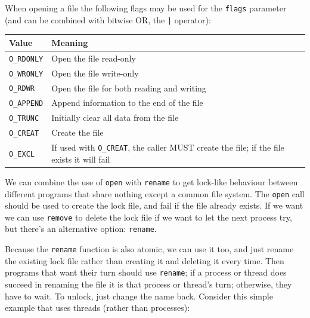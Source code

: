 When opening a file the following flags may be used for the \texttt{flags} parameter (and can be combined with bitwise OR, the \texttt{|} operator):

\begin{tabular}{l|l}
	\textbf{Value}     & \textbf{Meaning}                                                                                 \\ \hline
	\texttt{O\_RDONLY} & Open the file read-only                                                                          \\ \hline
	\texttt{O\_WRONLY} & Open the file write-only                                                                         \\ \hline
	\texttt{O\_RDWR}   & Open the file for both reading and writing                                                       \\ \hline
	\texttt{O\_APPEND} & Append information to the end of the file                                                        \\ \hline
	\texttt{O\_TRUNC}  & Initially clear all data from the file                                                           \\ \hline
	\texttt{O\_CREAT}  & Create the file                                                                                  \\ \hline
	\texttt{O\_EXCL}   & If used with \texttt{O\_CREAT}, the caller MUST create the file; if the file exists it will fail \\
\end{tabular}

We can combine the use of \texttt{open} with \texttt{rename} to get lock-like behaviour between different programs that share nothing except a common file system. The \texttt{open} call should be used to create the lock file, and fail if the file already exists. If we want we can use \texttt{remove} to delete the lock file if we want to let the next process try, but there's an alternative option: \texttt{rename}.

Because the \texttt{rename} function is also atomic, we can use it too, and just rename the existing lock file rather than creating it and deleting it every time. Then programs that want their turn should use \texttt{rename}; if a process or thread does succeed in renaming the file it is that process or thread's turn; otherwise, they have to wait. To unlock, just change the name back. Consider this simple example that uses threads (rather than processes):

